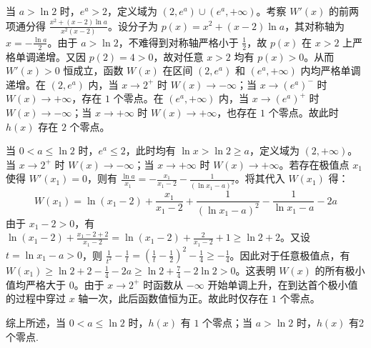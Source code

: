 \begin{solution}
当 $a > \ln 2$ 时，$e^a > 2$，定义域为 $(2, e^a) \cup (e^a, +\infty)$。考察 $W'(x)$ 的前两项通分得 $\frac{x^2 + (x-2)\ln a}{x^2(x-2)}$。设分子为 $p(x) = x^2 + (x-2)\ln a$，其对称轴为 $x = -\frac{\ln a}{2}$。由于 $a > \ln 2$，不难得到对称轴严格小于 $\frac{1}{2}$，故 $p(x)$ 在 $x > 2$ 上严格单调递增。又因 $p(2) = 4 > 0$，故对任意 $x > 2$ 均有 $p(x) > 0$。从而 $W'(x) > 0$ 恒成立，函数 $W(x)$ 在区间 $(2, e^a)$ 和 $(e^a, +\infty)$ 内均严格单调递增。在 $(2, e^a)$ 内，当 $x \to 2^+$ 时 $W(x) \to -\infty$；当 $x \to (e^a)^-$ 时 $W(x) \to +\infty$，存在 $1$ 个零点。在 $(e^a, +\infty)$ 内，当 $x \to (e^a)^+$ 时 $W(x) \to -\infty$；当 $x \to +\infty$ 时 $W(x) \to +\infty$，也存在 $1$ 个零点。故此时 $h(x)$ 存在 $2$ 个零点。

当 $0 < a \leqslant \ln 2$ 时，$e^a \leqslant 2$，此时均有 $\ln x > \ln 2 \geqslant a$，定义域为 $(2, +\infty)$。当 $x \to 2^+$ 时 $W(x) \to -\infty$；当 $x \to +\infty$ 时 $W(x) \to +\infty$。若存在极值点 $x_1$ 使得 $W'(x_1) = 0$，则有 $\frac{\ln a}{x_1} = -\frac{x_1}{x_1-2} - \frac{1}{(\ln x_1 - a)^2}$。将其代入 $W(x_1)$ 得：
$$W(x_1) = \ln(x_1-2) + \frac{x_1}{x_1-2} + \frac{1}{(\ln x_1 - a)^2} - \frac{1}{\ln x_1 - a} - 2a$$
由于 $x_1 - 2 > 0$，有 $\ln(x_1-2) + \frac{x_1-2+2}{x_1-2} = \ln(x_1-2) + \frac{2}{x_1-2} + 1 \geqslant \ln 2 + 2$。又设 $t = \ln x_1 - a > 0$，则 $\frac{1}{t^2} - \frac{1}{t} = \left(\frac{1}{t} - \frac{1}{2}\right)^2 - \frac{1}{4} \geqslant -\frac{1}{4}$。因此对于任意极值点，有 $W(x_1) \geqslant \ln 2 + 2 - \frac{1}{4} - 2a \geqslant \ln 2 + \frac{7}{4} - 2\ln 2 > 0$。这表明 $W(x)$ 的所有极小值均严格大于 $0$。由于 $x \to 2^+$ 时函数从 $-\infty$ 开始单调上升，在到达首个极小值的过程中穿过 $x$ 轴一次，此后函数值恒为正。故此时仅存在 $1$ 个零点。

综上所述，当 $0 < a \leqslant \ln 2$ 时，$h(x)$ 有 $1$ 个零点；当 $a > \ln2$ 时，$h(x)$ 有2个零点.
\end{solution}
